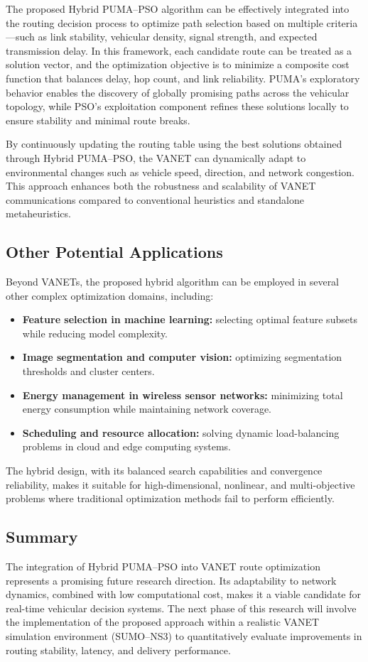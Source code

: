 \documentclass[a4paper,12pt]{article}
\begin{document}
The proposed Hybrid PUMA–PSO algorithm can be effectively integrated into the routing decision process to optimize path selection based on multiple criteria—such as link stability, vehicular density, signal strength, and expected transmission delay. 
In this framework, each candidate route can be treated as a solution vector, and the optimization objective is to minimize a composite cost function that balances delay, hop count, and link reliability. 
PUMA’s exploratory behavior enables the discovery of globally promising paths across the vehicular topology, while PSO’s exploitation component refines these solutions locally to ensure stability and minimal route breaks.

By continuously updating the routing table using the best solutions obtained through Hybrid PUMA–PSO, the VANET can dynamically adapt to environmental changes such as vehicle speed, direction, and network congestion. 
This approach enhances both the robustness and scalability of VANET communications compared to conventional heuristics and standalone metaheuristics.

\subsection{Other Potential Applications}
Beyond VANETs, the proposed hybrid algorithm can be employed in several other complex optimization domains, including:
\begin{itemize}
    \item \textbf{Feature selection in machine learning:} selecting optimal feature subsets while reducing model complexity.
    \item \textbf{Image segmentation and computer vision:} optimizing segmentation thresholds and cluster centers.
    \item \textbf{Energy management in wireless sensor networks:} minimizing total energy consumption while maintaining network coverage.
    \item \textbf{Scheduling and resource allocation:} solving dynamic load-balancing problems in cloud and edge computing systems.
\end{itemize}

The hybrid design, with its balanced search capabilities and convergence reliability, makes it suitable for high-dimensional, nonlinear, and multi-objective problems where traditional optimization methods fail to perform efficiently.

\subsection{Summary}
The integration of Hybrid PUMA–PSO into VANET route optimization represents a promising future research direction. 
Its adaptability to network dynamics, combined with low computational cost, makes it a viable candidate for real-time vehicular decision systems. 
The next phase of this research will involve the implementation of the proposed approach within a realistic VANET simulation environment (SUMO–NS3) to quantitatively evaluate improvements in routing stability, latency, and delivery performance.
\end{document}
